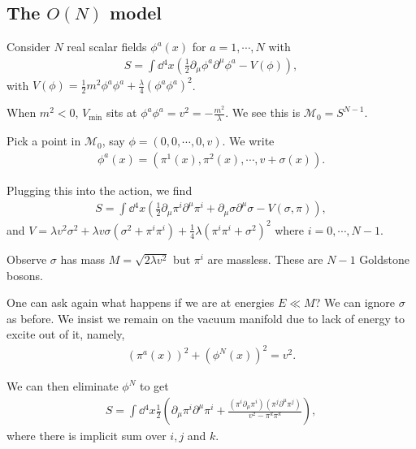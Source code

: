 \subsection{The $O\left( N \right) $ model}

Consider $N$ real scalar fields $\phi^{a}\left( x \right) $ for $a=1,\cdots, N$ with
\begin{align}
    S= \int \dd{^{4}x} \left( \frac{1}{2} \partial_\mu \phi^{a} \partial^{\mu} \phi^{a} - V \left( \phi \right) \right)
,\end{align}
with $V \left( \phi \right) = \frac{1}{2} m^2 \phi^{a} \phi^{a} + \frac{\lambda}{4} \left( \phi^{a} \phi^{a} \right)^2$.

When $m^2 < 0$, $V_\text{min}$ sits at $\phi^{a} \phi^{a} = v^2 = - \frac{m^2}{\lambda}$. We see this is $\mathcal{M}_0 = S^{N-1}$.

Pick a point in $\mathcal{M}_0$, say $\phi=\left( 0,0,\cdots,0,v \right) $. We write
\begin{align}
    \phi^{a}\left( x \right) = \left( \pi^{1}\left( x \right) , \pi^{2}\left( x \right) , \cdots, v + \sigma \left( x \right)  \right) 
.\end{align}

Plugging this into the action, we find
\begin{align}
    S = \int \dd{^{4}x} \left( \frac{1}{2} \partial_\mu \pi^{i} \partial^{\mu} \pi^{i} + \partial_\mu \sigma \partial^{\mu} \sigma - V \left( \sigma, \pi \right)  \right) 
,\end{align}
and $V = \lambda v^2 \sigma^2 + \lambda v \sigma \left( \sigma^2 + \pi^{i} \pi^{i} \right) + \frac{1}{4} \lambda \left( \pi^{i} \pi^{i} + \sigma^2 \right)^2$ where $i = 0,\cdots, N-1$.

Observe $\sigma$ has mass $M = \sqrt{2\lambda v^2} $ but $\pi^{i}$ are massless. These are $N-1$ Goldstone bosons.

One can ask again what happens if we are at energies $E \ll M$? We can ignore $\sigma$ as before. We insist we remain on the vacuum manifold due to lack of energy to excite out of it, namely,
\begin{align}
    \left( \pi^{a}\left( x \right)  \right)^2 + \left( \phi^{N}\left( x \right)  \right)^2 = v^2
.\end{align}

We can then eliminate $\phi^{N}$ to get
\begin{align}
    S = \int \dd{^{4}x} \frac{1}{2} \left( \partial_\mu \pi^{i} \partial^{\mu} \pi^{i} + \frac{\left( \pi^{i} \partial_\mu \pi^{i} \right) \left( \pi^{j} \partial^{\mu} \pi^{j} \right)  }{v^2 - \pi^{k} \pi^{k}}\right) 
,\end{align}
where there is implicit sum over $i,j$ and $k$.

